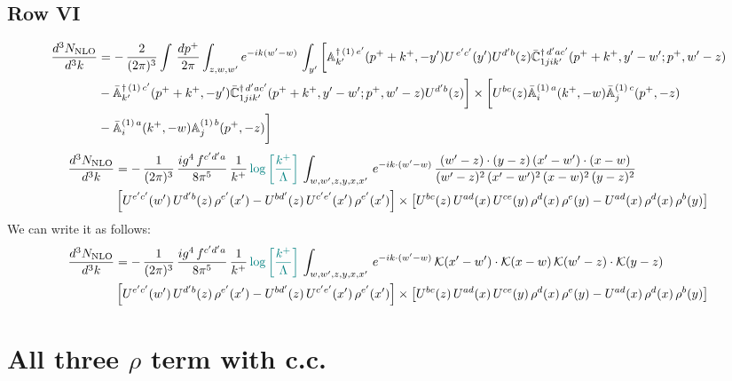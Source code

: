 \documentclass[9pt]{article}
\def\mf#1{\mathbb{#1}}
\numberwithin{equation}{section}
\begin{document}
\subsection{Row VI}
\begin{align}
     \frac{d^{3}N_{\rm NLO}}{d^{3}k} & =   -\,\frac{2}{(2\pi)^{3}} \int\, \frac{dp^{+}}{2\pi}\int_{z,w,w^{\prime}} e^{-ik(w^{\prime}-w)}\, \int_{y^{\prime}}\bigg[\mf{A}^{\dagger\, (1)\,e^{\prime}}_{k^{\prime}}(p^{+}+k^{+},-y^{\prime})U^{\, e^{\prime}c^{\prime}}(y^{\prime})U^{d^{\prime}b}(z) \Bar{\mf{C}}^{\dagger\, d^{\prime}ac^{\prime}}_{1jik^{\prime}}(p^{+}+k^{+},y^{\prime}-w^{\prime}; p^{+},w^{\prime}-z) \notag \\ & -\Bar{\mf{A}}^{\dagger\, (1)\,c^{\prime}}_{k^{\prime}}(p^{+}+k^{+},-y^{\prime})\Bar{\mf{C}}^{\dagger\, d^{\prime}ac^{\prime}}_{1jik^{\prime}}(p^{+}+k^{+},y^{\prime}-w^{\prime}; p^{+},w^{\prime}-z)U^{d^{\prime}b}(z)\bigg] \times \bigg[U^{bc}(z)\Bar{\mf{A}}^{(1)\, a}_{i}(k^{+},- w)\Bar{\mf{A}}^{(1)\, c}_{j}(p^{+},-z)\notag \\ & -\Bar{\mf{A}}^{(1)\, a}_{i}(k^{+},- w) \mf{A}^{(1)\, b}_{j}(p^{+},- z)\bigg]\nonumber
\end{align}
\begin{align}
    \frac{d^{3}N_{\rm NLO}}{d^{3}k} & = -\,\frac{1}{(2\pi)^{3}}\, \frac{ig^{4}\,f^{c'd'a}}{8\pi^{5}}\, \frac{1}{k^{+}}\,{\color{teal}\log{\left[\frac{k^{+}}{\Lambda}\right]}}\, \int_{w,w',z,y,x,x'}\, e^{-ik\cdot (w'-w)}\,\frac{(w'-z)\cdot (y-z)\,(x'-w')\cdot (x-w)}{(w'-z)^{2}\,(x'-w')^{2}\,(x-w)^{2}\,(y-z)^{2}}\notag \\ & \left[U^{e'c'}(w')\,U^{d'b}(z)\,\rho^{e'}(x')-U^{bd'}(z)\,U^{c'e'}(x')\,\rho^{e'}(x')\right]\times  \left[U^{bc}(z)\,U^{ad}(x)\,U^{ce}(y)\,\rho^{d}(x)\,\rho^{e}(y)-U^{ad}(x)\,\rho^{d}(x)\,\rho^{b}(y)\right]
\end{align}
We can write it as follows:
\begin{align}
    \frac{d^{3}N_{\rm NLO}}{d^{3}k} & = -\,\frac{1}{(2\pi)^{3}}\, \frac{ig^{4}\,f^{c'd'a}}{8\pi^{5}}\, \frac{1}{k^{+}}\,{\color{teal}\log{\left[\frac{k^{+}}{\Lambda}\right]}}\, \int_{w,w',z,y,x,x'}\, e^{-ik\cdot (w'-w)}\,\mathcal{K}(x'-w')\cdot \mathcal{K}(x-w)\,\mathcal{K}(w'-z)\cdot \mathcal{K}(y-z)\notag \\ & \left[U^{e'c'}(w')\,U^{d'b}(z)\,\rho^{e'}(x')-U^{bd'}(z)\,U^{c'e'}(x')\,\rho^{e'}(x')\right]\times  \left[U^{bc}(z)\,U^{ad}(x)\,U^{ce}(y)\,\rho^{d}(x)\,\rho^{e}(y)-U^{ad}(x)\,\rho^{d}(x)\,\rho^{b}(y)\right]
\end{align}
\section{All three $\rho$ term with c.c.}
\end{document}
